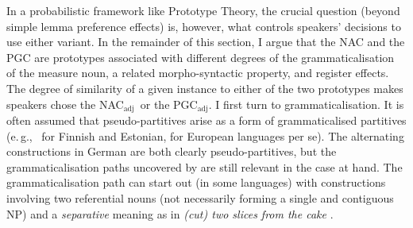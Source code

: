 \documentclass[USenglish]{article}
\newcommand{\eg}{e.\,g.,}
\newcommand{\Sub}[1]{\ensuremath{\mathrm{_{#1}}}}
\newcommand{\NACa}{NAC\Sub{adj}}
\newcommand{\PGCa}{PGC\Sub{adj}}
\begin{document}
In a probabilistic framework like Prototype Theory, the crucial question (beyond simple lemma preference effects) is, however, what controls speakers' decisions to use either variant. 
In the remainder of this section, I argue that the NAC and the PGC are prototypes associated with different degrees of the grammaticalisation of the measure noun, a related morpho-syntactic property, and register effects.
The degree of similarity of a given instance to either of the two prototypes makes speakers chose the \NACa\ or the \PGCa.
I first turn to grammaticalisation.
It is often assumed that pseudo-partitives arise as a form of grammaticalised partitives (\eg\ \citealp[536--539]{Koptjevskaja2001} for Finnish and Estonian, \citealp[559]{Koptjevskaja2001} for European languages per se).
%
%
%
%
The alternating constructions in German are both clearly pseudo-partitives, but the grammaticalisation paths uncovered by \cite[esp.\ 526--530]{Koptjevskaja2001} are still relevant in the case at hand.
The grammaticalisation path can start out (in some languages) with constructions involving two referential nouns (not necessarily forming a single and contiguous NP) and a \textit{separative} meaning as in \textit{(cut) two slices from the cake} \citep[535]{Koptjevskaja2001}.
\end{document}
